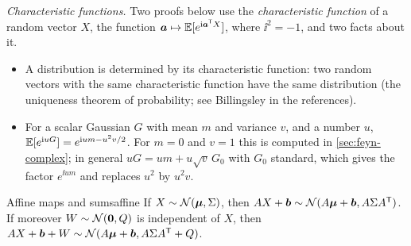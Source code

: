 \emph{Characteristic functions.} Two proofs below use the
\emph{characteristic function} of a random vector $X$, the function
$\bm{a}\mapsto\mathbb{E}[e^{\mathrm{i}\bm{a}^{\mathsf{T}} X}]$, where $\ii^2=-1$, and two facts
about it.
\begin{itemize}[nosep]
  \item A distribution is determined by its characteristic function: two
        random vectors with the same characteristic function have the
        same distribution (the uniqueness theorem of probability; see
        Billingsley in the references).
  \item For a scalar Gaussian $G$ with mean $m$ and variance $v$, and a
        number $u$, $\mathbb{E}[e^{\mathrm{i} uG}]=e^{\mathrm{i} um-u^2v/2}$. For $m=0$ and
        $v=1$ this is computed in \cref{sec:feyn-complex}; in general
        $uG=um+u\sqrt v\,G_0$ with $G_0$ standard, which gives the factor
        $e^{\ii um}$ and replaces $u^2$ by $u^2v$.
\end{itemize}

\begin{lemma}{Affine maps and sums}{affine}
If $X\sim\mathcal{N}(\bm{\mu},\Sigma)$, then $AX+\bm{b}\sim\mathcal{N}(A\bm{\mu}+\bm{b},
A\Sigma A^{\mathsf{T}})$. If moreover $W\sim\mathcal{N}(\bm{0},Q)$ is independent of
$X$, then $AX+\bm{b}+W\sim\mathcal{N}(A\bm{\mu}+\bm{b},A\Sigma A^{\mathsf{T}}+Q)$.
\end{lemma}

